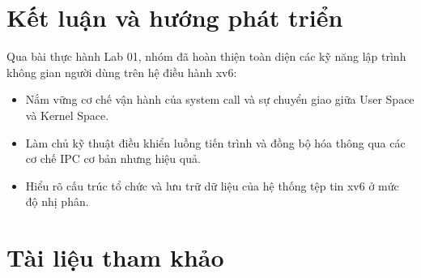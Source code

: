 \documentclass[12pt,a4paper]{article}
\begin{document}
\section{Kết luận và hướng phát triển}

Qua bài thực hành Lab 01, nhóm đã hoàn thiện toàn diện các kỹ năng lập trình không gian người dùng trên hệ điều hành xv6:
\begin{itemize}
  \item Nắm vững cơ chế vận hành của system call và sự chuyển giao giữa User Space và Kernel Space.
  \item Làm chủ kỹ thuật điều khiển luồng tiến trình và đồng bộ hóa thông qua các cơ chế IPC cơ bản nhưng hiệu quả.
  \item Hiểu rõ cấu trúc tổ chức và lưu trữ dữ liệu của hệ thống tệp tin xv6 ở mức độ nhị phân.
\end{itemize}

\section*{Tài liệu tham khảo}
\end{document}

